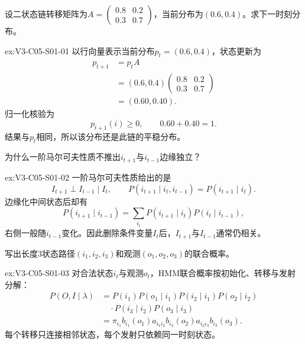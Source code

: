 \begin{SLChapterExercisePairSection}

\begin{exercise}\label{ex:V3-C05-S01-01}
设二状态链转移矩阵为$A=\begin{pmatrix}0.8&0.2\\0.3&0.7\end{pmatrix}$，当前分布为$(0.6,0.4)$。求下一时刻分布。
\end{exercise}
\ifSLFullEdition
{}\label{sol:V3-C05-S01-01}
\begin{chapterexercisesolution}{ex:V3-C05-S01-01}
以行向量表示当前分布$p_t=(0.6,0.4)$，状态更新为
\[
\begin{aligned}
p_{t+1}&=p_tA\\
&=(0.6,0.4)
\begin{pmatrix}0.8&0.2\\0.3&0.7\end{pmatrix}\\
&=(0.60,0.40).
\end{aligned}
\]
归一化核验为
\[
p_{t+1}(i)\geq0,
\qquad
0.60+0.40=1.
\]
结果与$p_t$相同，所以该分布还是此链的平稳分布。
\end{chapterexercisesolution}
\fi

\begin{exercise}\label{ex:V3-C05-S01-02}
为什么一阶马尔可夫性质不推出$i_{t+1}$与$i_{t-1}$边缘独立？
\end{exercise}
\ifSLFullEdition
{}\label{sol:V3-C05-S01-02}
\begin{chapterexercisesolution}{ex:V3-C05-S01-02}
一阶马尔可夫性质给出的是
\[
I_{t+1}\perp I_{t-1}\mid I_t,
\qquad
P(i_{t+1}\mid i_t,i_{t-1})=P(i_{t+1}\mid i_t).
\]
边缘化中间状态后却有
\[
P(i_{t+1}\mid i_{t-1})
=\sum_{i_t}P(i_{t+1}\mid i_t)P(i_t\mid i_{t-1}),
\]
右侧一般随$i_{t-1}$变化。因此删除条件变量$I_t$后，$I_{t+1}$与$I_{t-1}$通常仍相关。
\end{chapterexercisesolution}
\fi

\begin{exercise}\label{ex:V3-C05-S01-03}
写出长度3状态路径$(i_1,i_2,i_3)$和观测$(o_1,o_2,o_3)$的联合概率。
\end{exercise}
\ifSLFullEdition
{}\label{sol:V3-C05-S01-03}
\begin{chapterexercisesolution}{ex:V3-C05-S01-03}
对合法状态$i_t$与观测$o_t$，HMM联合概率按初始化、转移与发射分解：
\[
\begin{aligned}
P(O,I\mid\lambda)
&=P(i_1)P(o_1\mid i_1)
P(i_2\mid i_1)P(o_2\mid i_2)\\
&\quad\cdot P(i_3\mid i_2)P(o_3\mid i_3)\\
&=\pi_{i_1}b_{i_1}(o_1)a_{i_1i_2}b_{i_2}(o_2)
a_{i_2i_3}b_{i_3}(o_3).
\end{aligned}
\]
每个转移只连接相邻状态，每个发射只依赖同一时刻状态。
\end{chapterexercisesolution}
\fi


\end{SLChapterExercisePairSection}
